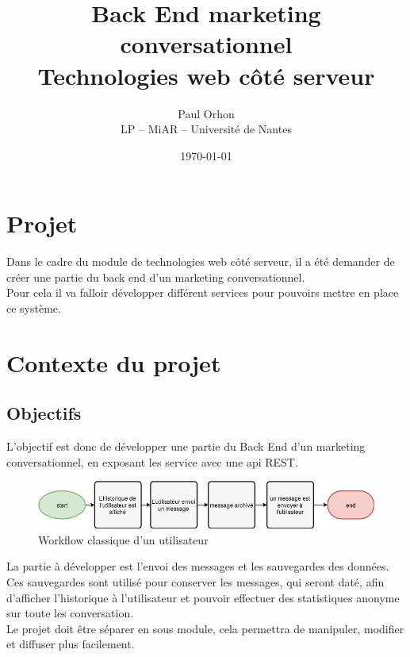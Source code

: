 \documentclass[12pt]{article}
\title{Back End marketing conversationnel\\
    \normalsize Technologies web côté serveur}
\date{\today}
\author{Paul Orhon\\
\small LP -- MiAR -- Université de Nantes }
\begin{document}
\maketitle%
\clearpage
\tableofcontents

\listoffigures


\clearpage

\section{Projet}
Dans le cadre du module de technologies web côté serveur, il a été demander de créer une partie du back end d’un marketing conversationnel.
\\

Pour cela il va falloir développer différent services pour pouvoirs mettre en place ce système.



\section{Contexte du projet}
\subsection{Objectifs}
L'objectif est donc de développer une partie du Back End d’un marketing conversationnel, en exposant les service avec une api REST.
\\

\begin{figure}[h]
    \centering
    \includegraphics[width=\linewidth]{img/workflow_user.png}
    \caption{Workflow classique d'un utilisateur}
\end{figure}

La partie à développer est l'envoi des messages et les sauvegardes des données. Ces sauvegardes sont utilisé pour conserver les messages, qui seront daté, afin d'afficher l'historique à l'utilisateur et pouvoir effectuer des statistiques anonyme sur toute les conversation.
\\

Le projet doit être séparer en sous module, cela permettra de manipuler, modifier et diffuser plus facilement.
\end{document}
